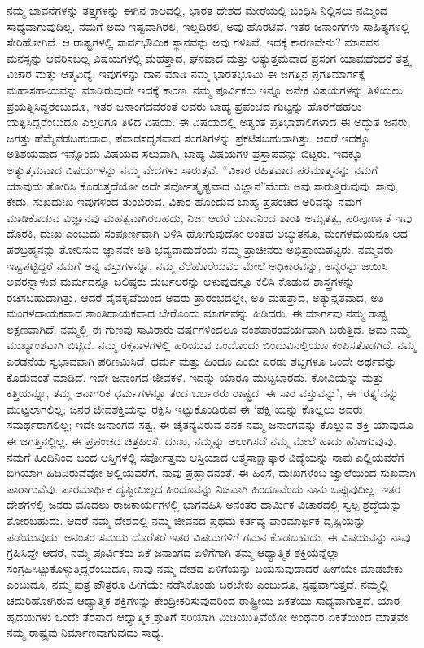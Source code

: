 ನಮ್ಮ ಭಾವನೆಗಳನ್ನು ತತ್ತ್ವಗಳನ್ನು ಈಗಿನ ಕಾಲದಲ್ಲಿ, ಭಾರತ ದೇಶದ ಮೇರೆಯಲ್ಲಿ ಬಂಧಿಸಿ ನಿಲ್ಲಿಸಲು ನಮ್ಮಿಂದ ಸಾಧ್ಯವಾಗುವುದಿಲ್ಲ. ನಮಗೆ ಅದು ಇಷ್ಟವಾಗಿರಲಿ, ಇಲ್ಲದಿರಲಿ, ಅವು ಹೊರಟಿವೆ, ಇತರ ಜನಾಂಗಗಳು ಸಾಹಿತ್ಯಗಳಲ್ಲಿ ಸೇರಿಹೋಗಿವೆ. ಆ ರಾಷ್ಟ್ರಗಳಲ್ಲಿ ಸಾರ್ವಭೌಮಿಕ ಸ್ಥಾನವನ್ನು ಅವು ಗಳಿಸಿವೆ. ಇದಕ್ಕೆ ಕಾರಣವೇನು? ಮಾನವನ ಮನಸ್ಸನ್ನು ಆವರಿಸಬಲ್ಲ ವಿಷಯಗಳಲ್ಲಿ ಮಹತ್ತಾದ, ಘನವಾದ ಮತ್ತು ಅತ್ಯುತ್ತಮವಾದ ಪ್ರಸಂಗ ಯಾವುದೆಂದರೆ ತತ್ತ್ವ ವಿಚಾರ ಮತ್ತು ಆತ್ಮವಿದ್ಯೆ. ಇವುಗಳನ್ನು ದಾನ ಮಾಡಿ ನಮ್ಮ ಭಾರತಭೂಮಿ ಈ ಜಗತ್ತಿನ ಪ್ರಗತಿಮಾರ್ಗಕ್ಕೆ ಮಹಾಸಹಾಯವನ್ನು ಮಾಡಿರುವುದೇ ಇದಕ್ಕೆ ಕಾರಣ. ನಮ್ಮ ಪೂರ್ವಿಕರು ಇನ್ನೂ ಅನೇಕ ವಿಷಯಗಳನ್ನು ತಿಳಿಯಲು ಪ್ರಯತ್ನಿಸಿದ್ದರೆಂಬುದೂ, ಇತರ ಜನಾಂಗದವರಂತೆ ಅವರು ಬಾಹ್ಯ ಪ್ರಪಂಚದ ಗುಟ್ಟನ್ನು ಹೊರಗೆಡಹಲು ಯತ್ನಿಸಿದ್ದರೆಂಬುದೂ ಎಲ್ಲರಿಗೂ ತಿಳಿದ ವಿಷಯ. ಈ ವಿಷಯದಲ್ಲಿ ಅತ್ಯಂತ ಪ್ರತಿಭಾಶಾಲಿಗಳಾದ ಈ ಅದ್ಭುತ ಜನರು, ಜಗತ್ತು ಹೆಮ್ಮೆಪಡಬಹುದಾದ, ಪವಾಡಸದೃಶವಾದ ಸಂಗತಿಗಳನ್ನು ಪ್ರಕಟಿಸಬಹುದಾಗಿತ್ತು. ಆದರೆ ಇದಕ್ಕೂ ಅತಿಶಯವಾದ ಇನ್ನೊಂದು ವಿಷಯದ ಸಲುವಾಗಿ, ಬಾಹ್ಯ ವಿಷಯಗಳ ಪ್ರಸ್ತಾಪವನ್ನು ಬಿಟ್ಟರು. ಇದಕ್ಕೂ ಅತ್ಯುತ್ತಮವಾದ ವಿಷಯಗಳನ್ನು ನಮ್ಮ ವೇದಗಳು ಸಾರುತ್ತವೆ. “ವಿಕಾರ ರಹಿತವಾದ ಪರಮಾತ್ಮನನ್ನು ನಮಗೆ ಯಾವುದು ತೋರಿಸಿ ಕೊಡುತ್ತದೆಯೋ ಅದೇ ಸರ್ವೋತ್ಕೃಷ್ಟವಾದ ವಿಜ್ಞಾನ”ವೆಂದು ಅವು ಸಾರುತ್ತಿರುವುವು. ಸಾವು, ಕೇಡು, ಸುಖದುಃಖ ಇವುಗಳಿಂದ ತುಂಬಿರುವ, ವಿಕಾರ ಹೊಂದುವ ಬಾಹ್ಯ ಪ್ರಪಂಚದ ಅರಿವನ್ನು ನಮಗೆ ಮಾಡಿಕೊಡುವ ವಿಜ್ಞಾನವು ಮಹತ್ವವಾಗಿರಬಹದು, ನಿಜ; ಆದರೆ ಯಾವನಿಂದ ಶಾಂತಿ ಅಮೃತತ್ವ, ಪರಿಪೂರ್ಣತೆ ಇವು ದೊರಕಿ, ದುಃಖ ಎಂಬುದು ಸಂಪೂರ್ಣವಾಗಿ ಅಳಿಸಿ ಹೋಗುವುದೋ ಅಂತಹ ಅಚ್ಯುತನೂ, ಮಂಗಳಮಯನೂ ಆದ ಪರಬ್ರಹ್ಮನನ್ನು ತೋರಿಸುವ ಜ್ಞಾನವೇ ಅತಿ ಭವ್ಯವಾದುದೆಂದು ನಮ್ಮ ಪ್ರಾಚೀನರು ಅಭಿಪ್ರಾಯಪಟ್ಟರು. ನಮ್ಮವರು ಇಷ್ಟಪಟ್ಟಿದ್ದರೆ ನಮಗೆ ಅನ್ನ ವಸ್ತುಗಳನ್ನೂ, ನಮ್ಮ ನೆರೆಹೊರೆಯವರ ಮೇಲೆ ಅಧಿಕಾರವನ್ನು, ಅನ್ಯರನ್ನು ಜಯಿಸಿ ಅವರನ್ನಾಳುವ ಮರ್ಮವನ್ನೂ ಬಲಿಷ್ಠರು ದುರ್ಬಲರನ್ನು ಆಳುವುದನ್ನೂ ಕಲಿಸಿ ಕೊಡುವ ಶಾಸ್ತ್ರಗಳನ್ನು ರಚಿಸಬಹುದಾಗಿತ್ತು. ಆದರೆ ದೈವಕೃಪೆಯಿಂದ ಅವರು ಪ್ರಾರಂಭದಲ್ಲೇ, ಅತಿ ಮಹತ್ತಾದ, ಅತ್ಯುನ್ನತವಾದ, ಅತಿ ಮಂಗಳದಾಯಕವಾದ ಶಾಂತಿದಾಯಕವಾದ ಬೇರೊಂದು ಮಾರ್ಗವನ್ನು ಹಿಡಿದರು. ಈ ಮಾರ್ಗವು ನಮ್ಮ ರಾಷ್ಟ್ರ ಲಕ್ಷಣವಾಗಿದೆ. ನಮ್ಮಲ್ಲಿ ಈ ಗುಣವು ಸಾವಿರಾರು ವರ್ಷಗಳಿಂದಲೂ ವಂಶಪಾರಂಪರ್ಯವಾಗಿ ಬರುತ್ತಿದೆ. ಅದು ನಮ್ಮ ಮುಖ್ಯಾಂಶವಾಗಿ ಬಿಟ್ಟಿದೆ. ನಮ್ಮ ರಕ್ತನಾಳಗಳಲ್ಲಿ ಹರಿಯುವ ಒಂದೊಂದು ಬಿಂದುವಿನಲ್ಲಿಯೂ ಕಂಪಿಸತೊಡಗಿದೆ. ನಮ್ಮ ಎರಡನೆಯ ಸ್ವಭಾವವಾಗಿ ಪರಿಣಮಿಸಿದೆ. ಧರ್ಮ ಮತ್ತು ಹಿಂದೂ ಎಂಬೀ ಎರಡು ಶಬ್ದಗಳೂ ಒಂದೇ ಅರ್ಥವನ್ನು ಕೊಡುವಂತೆ ಮಾಡಿದೆ. ಇದೇ ಜನಾಂಗದ ಜೀವಕಳೆ. ಇದನ್ನು ಯಾರೂ ಮುಟ್ಟಬಾರದು. ಕೋವಿಯನ್ನು ಮತ್ತು ಕತ್ತಿಯನ್ನೂ, ತಮ್ಮ ಅನಾಗರಿಕ ಧರ್ಮಗಳನ್ನೂ ತಂದ ಬರ್ಬರರು ರಾಷ್ಟ್ರದ ‘ಈ ಸಾರ ವಸ್ತುವನ್ನು’, ಈ ‘ರತ್ನ’ವನ್ನು ಮುಟ್ಟಲಾಗಲಿಲ್ಲ; ಜನರ ಜೀವಶಕ್ತಿಯನ್ನು ರಕ್ಷಿಸಿ ಇಟ್ಟುಕೊಂಡಿರುವ ಈ ‘ಪಕ್ಷಿ’ಯನ್ನು ಕೊಲ್ಲಲು ಅವರು ಸಮರ್ಥರಾಗಲಿಲ್ಲ; ಇದೇ ಜನಾಂಗದ ಸತ್ವ. ಈ ಚೈತನ್ಯವಿರುವ ತನಕ ನಮ್ಮ ಜನಾಂಗವನ್ನು ಕೊಲ್ಲುವ ಶಕ್ತಿ ಯಾವುದೂ ಈ ಜಗತ್ತಿನಲ್ಲಿಲ್ಲ. ಈ ಪ್ರಪಂಚದ ಚಿತ್ರಹಿಂಸೆ, ದುಃಖ, ನಮ್ಮನ್ನು ಅಲುಗಿಸದೆ ನಮ್ಮ ಮೇಲೆ ಹಾದು ಹೋಗುವುವು. ನಮಗೆ ಹಿಂದಿನಿಂದ ಬಂದ ಆಸ್ತಿಗಳಲ್ಲಿ ಸರ್ವೋತ್ತಮ ಆಸ್ತಿಯಾದ ಆತ್ಮಸಾಕ್ಷಾತ್ಕಾರ ವಿದ್ಯೆಯನ್ನು ನಾವು ಎಲ್ಲಿಯವರೆಗೆ ಬಿಗಿಯಾಗಿ ಹಿಡಿದಿರುವೆವೋ ಅಲ್ಲಿಯವರೆಗೆ, ನಾವು ಪ್ರಹ್ಲಾದನಂತೆ, ಈ ಹಿಂಸೆ, ದುಃಖಗಳೆಂಬ ಜ್ವಾಲೆಯಿಂದ ಸುಖವಾಗಿ ಪಾರಾಗುವೆವು. ಪಾರಮಾರ್ಥಿಕ ದೃಷ್ಟಿಯಿಲ್ಲದ ಹಿಂದೂವನ್ನು ನಿಜವಾಗಿ ಹಿಂದೂವೆಂದು ನಾನು ಒಪ್ಪುವುದಿಲ್ಲ. ಇತರ ದೇಶಗಳಲ್ಲಿ ಜನರು ಮೊದಲು ರಾಜಕಾರ್ಯಗಳಲ್ಲಿ ಭಾಗವಹಿಸಿ ಅನಂತರ ಧಾರ್ಮಿಕ ವಿಚಾರದಲ್ಲಿ ಸ್ವಲ್ಪ ಶ್ರದ್ಧೆಯನ್ನು ತೋರಬಹುದು. ಆದರೆ ನಮ್ಮ ದೇಶದಲ್ಲಿ ನಮ್ಮ ಜೀವನದ ಪ್ರಥಮ ಕರ್ತವ್ಯ ಪಾರಮಾರ್ಥಿಕ ದೃಷ್ಟಿಯನ್ನು ಪಡೆಯುವುದು. ಅನಂತರ ಸಮಯ ದೊರೆತರೆ ಇತರ ವಿಷಯಗಳಿಗೆ ಗಮನ ಕೊಡಬಹುದು. ಈ ವಿಷಯವನ್ನು ನಾವು ಗ್ರಹಿಸಿದ್ದೇ ಆದರೆ, ನಮ್ಮ ಪೂರ್ವಿಕರು ಏಕೆ ಜನಾಂಗದ ಏಳಿಗೆಗಾಗಿ ತಮ್ಮ ಆಧ್ಯಾತ್ಮಿಕ ಶಕ್ತಿಯನ್ನೆಲ್ಲಾ ಸಂಗ್ರಹಿಸಿಟ್ಟುಕೊಳ್ಳುತ್ತಿದ್ದರೆಂಬುದೂ, ನಾವು ನಮ್ಮ ದೇಶದ ಏಳಿಗೆಯನ್ನು ಬಯಸುವುದಾದರೆ ಹೀಗೆಯೇ ಮಾಡಬೇಕು ಎಂಬುದೂ, ನಮ್ಮ ಪುತ್ರ ಪೌತ್ರರೂ ಹೀಗೆಯೇ ನಡೆಸಿಕೊಂಡು ಬರಬೇಕು ಎಂಬುದೂ, ಸ್ಪಷ್ಟವಾಗುತ್ತದೆ. ನಮ್ಮಲ್ಲಿ ಚದುರಿಹೋಗಿರುವ ಆಧ್ಯಾತ್ಮಿಕ ಶಕ್ತಿಗಳನ್ನು ಕೇಂದ್ರೀಕರಿಸುವುದರಿಂದ ರಾಷ್ಟ್ರೀಯ ಏಕತೆಯು ಸಾಧ್ಯವಾಗುತ್ತದೆ. ಯಾರ ಹೃದಯಗಳು ಒಂದೇ ತೆರನಾದ ಆಧ್ಯಾತ್ಮಿಕ ಶ್ರುತಿಗೆ ಸರಿಯಾಗಿ ಮಿಡಿಯುತ್ತಿವೆಯೋ ಅಂಥವರ ಏಕತೆಯಿಂದ ಮಾತ್ರವೇ ನಮ್ಮ ರಾಷ್ಟ್ರವು ನಿರ್ಮಾಣವಾಗುವುದು ಸಾಧ್ಯ. 


